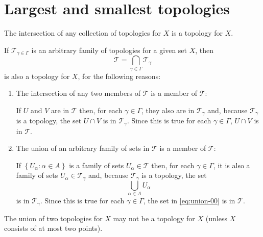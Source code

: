 \section{Largest and smallest topologies}

\begin{problem}
  The intersection of any collection of topologies for \(X\) is a topology for
  \(X\).
\end{problem}

\begin{solution}
  If \(\mathcal{T}_{\gamma\in\Gamma}\) is an arbitrary family of topologies for
  a given set \(X\), then 
  \[
    \mathcal{T}=\bigcap_{\gamma\in\Gamma}\mathcal{T}_{\gamma}
  \]
  is also a topology for \(X\), for the following reasons:
  \begin{enumerate}
    \item
      The intersection of any two members of \(\mathcal{T}\) is a member of
      \(\mathcal{T}\):

      If \(U\) and \(V\) are in \(\mathcal{T}\) then, for each
      \(\gamma\in\Gamma\), they also are in \(\mathcal{T}_{\gamma}\) and,
      because \(\mathcal{T}_{\gamma}\) is a topology, the set \(U\cap{V}\) is
      in \(\mathcal{T}_{\gamma}\). Since this is true for each
      \(\gamma\in\Gamma\), \(U\cap{V}\) is in \(\mathcal{T}\).

    \item
      The union of an arbitrary family of sets in \(\mathcal{T}\) is a member
      of \(\mathcal{T}\):

      If \(\left\{U_{\alpha}:\alpha\in{A}\right\}\) is a family of sets
      \(U_{\alpha}\in\mathcal{T}\) then, for each \(\gamma\in\Gamma\), it is
      also a family of sets \(U_{\alpha}\in\mathcal{T}_{\gamma}\) and, because
      \(\mathcal{T}_{\gamma}\) is a topology, the set
      \begin{equation}
        \bigcup_{\alpha\in{A}}U_{\alpha}
        \label{eq:union-00}
      \end{equation}
      is in \(\mathcal{T}_{\gamma}\). Since this is true for each
      \(\gamma\in\Gamma\), the set in \eqref{eq:union-00} is in
      \(\mathcal{T}\).

  \end{enumerate}
\end{solution}

\begin{problem}
  The union of two topologies for \(X\) may not be a topology for \(X\) (unless
  \(X\) consists of at most two points).
\end{problem}

